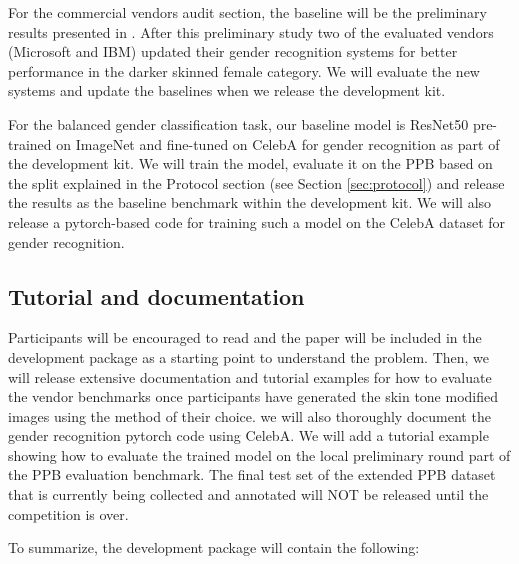 \documentclass[11pt, oneside]{article}
\makeatletter
\let\@internalcite\cite
\def\cite{\def\citeauthoryear##1##2{##1, ##2}\@internalcite}
\makeatother
\begin{document}
For the commercial vendors audit section, the baseline will be the preliminary 
results presented in \cite{buolamwini2018gender}. After this preliminary study 
two of the evaluated vendors (Microsoft and IBM) updated their gender 
recognition systems for better performance in the darker skinned female category. We 
will evaluate the new systems and update the baselines when we release the 
development kit.

For the balanced gender classification task, our baseline model is ResNet50 
pre-trained on ImageNet and fine-tuned on CelebA for gender recognition as part 
of the development kit. We will train the model, evaluate it on the PPB based on 
the split explained in the Protocol section (see Section \ref{sec:protocol}) 
and release the results as the baseline benchmark within the development kit. 
We will also release a pytorch-based code for training such a model on the 
CelebA dataset for gender recognition.

\subsection{Tutorial and documentation}

Participants will be encouraged to read \cite{buolamwini2018gender} and the 
paper will be included in the development package as a starting point to 
understand the problem. Then, we will release extensive documentation and 
tutorial examples for how to evaluate the vendor benchmarks once participants 
have generated the skin tone modified images using the method of their choice. 
we will also thoroughly document the gender recognition pytorch code using 
CelebA. We will add a tutorial example showing how to evaluate the trained 
model on the local preliminary round part of the PPB evaluation benchmark. The 
final test set of the extended PPB dataset that is currently being collected 
and annotated will NOT be released until the competition is over.

To summarize, the development package will contain the following:
\end{document}
